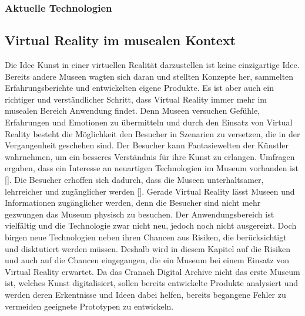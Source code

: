 \documentclass[a4paper,12pt,oneside]{article}
\begin{document}
        \subsubsection{Aktuelle Technologien}

    \subsection{Virtual Reality im musealen Kontext}
      Die Idee Kunst in einer virtuellen Realität darzustellen ist keine einzigartige Idee.
      Bereits andere Museen wagten sich daran und stellten Konzepte her, sammelten
      Erfahrungsberichte und entwickelten eigene Produkte. Es ist
      aber auch ein richtiger und verständlicher Schritt, dass Virtual Reality immer mehr
      im musealen Bereich Anwendung findet. Denn Museen versuchen Gefühle,
      Erfahrungen und Emotionen zu übermitteln und durch den Einsatz von Virtual Reality
      besteht die Möglichkeit den Besucher in Szenarien zu versetzen, die in der
      Vergangenheit geschehen sind. Der Besucher kann Fantasiewelten der Künstler
      wahrnehmen, um ein besseres Verständnis für ihre Kunst zu erlangen. Umfragen ergaben, 
      dass ein Interesse an neuartigen Technologien im Museum vorhanden ist [\cite[34]{Heidsiek2019}].
      Die Besucher erhoffen sich dadurch, dass die Museen unterhaltsamer, lehrreicher und
      zugänglicher werden [\cite[34]{Heidsiek2019}]. Gerade Virtual Reality lässt Museen
      und Informationen zugänglicher werden, denn die Besucher sind nicht mehr gezwungen 
      das Museum physisch zu besuchen. Der Anwendungsbereich ist vielfältig und die 
      Technologie zwar nicht neu, jedoch noch nicht ausgereizt.
      Doch birgen neue Technologien neben ihren Chancen aus Risiken, die berücksichtigt
      und disktutiert werden müssen. Deshalb wird in diesem Kapitel auf die
      Risiken und auch auf die Chancen eingegangen, die ein Museum bei einem Einsatz von
      Virtual Reality erwartet. Da das Cranach Digital Archive nicht das erste Museum ist, 
      welches Kunst digitalisiert, sollen bereits entwickelte Produkte analysiert und 
      werden deren Erkentnisse und Ideen dabei helfen, bereits begangene Fehler zu 
      vermeiden geeignete Prototypen zu entwickeln.
\end{document}
